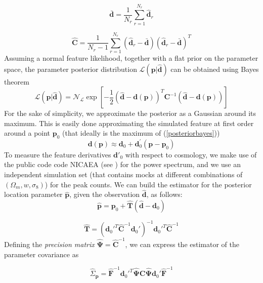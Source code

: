 \documentclass[reprint,aps,prd,superscriptaddress,showkeys,showpacs]{revtex4-1}
\newcommand{\bb}[1]{\mathbf{#1}}
\newcommand{\bbh}[1]{\mathbf{\hat{#1}}}
\newcommand{\h}[1]{\hat{#1}}
\begin{document}
\begin{equation}
\bb{\bar{d}} = \frac{1}{N_r}\sum_{r=1}^{N_r} \bbh{d}_r
\end{equation}

\begin{equation}
\label{covest}
\bbh{C} = \frac{1}{N_r-1}\sum_{r=1}^{N_r} (\bbh{d}_r - \bar{\bb{d}}) (\bbh{d}_r - \bar{\bb{d}})^T
\end{equation}
%
Assuming a normal feature likelihood, together with a flat prior on the parameter space, the parameter posterior distribution $\mathcal{L}(\bb{p}\vert\bbh{d})$ can be obtained using Bayes theorem
\begin{equation}
\label{posteriorbayes}
\mathcal{L}(\bb{p}\vert\bbh{d}) = \mathcal{N}_\mathcal{L}\exp{\left[-\frac{1}{2}(\bbh{d}-\bb{d}(\bb{p}))^T\bb{C}^{-1}(\bbh{d}-\bb{d}(\bb{p}))\right]}
\end{equation}
%
For the sake of simplicity, we approximate the posterior as a Gaussian around its maximum. This is easily done approximating the simulated feature at first order around a point $\bb{p}_0$ (that ideally is the maximum of (\ref{posteriorbayes}))
\begin{equation}
\bb{d}(\bb{p}) \approx \bb{d}_0 + \bb{d}_0^\prime(\bb{p}-\bb{p}_0) 
\end{equation}
%
To measure the feature derivatives $\bb{d}'_0$ with respect to cosmology, we make use of the public code code NICAEA (see \citep{Nicaea}) for the power spectrum, and we use an independent simulation set (that contains mocks at different combinations of $(\Omega_m,w,\sigma_8)$) for the peak counts.
We can build the estimator for the posterior location parameter $\bbh{p}$, given the observation $\bbh{d}$, as follows:
%
\begin{equation}
\label{estimatormean}
\bbh{p} = \bb{p}_0 + \bbh{T}(\bbh{d}-\bb{d}_0)
\end{equation}

\begin{equation}
\bbh{T} = (\bb{d}_0'^T\bbh{C}^{-1}\bb{d}_0')^{-1}\bb{d}_0'^T\bbh{C}^{-1}
\end{equation}
%
Defining the \textit{precision matrix} $\bbh{\Psi}=\bbh{C}^{-1}$, we can express the estimator of the parameter covariance as 

\begin{equation}
\label{estimatorcovariance}
\h{\Sigma}_\bb{p} = \bbh{F}^{-1}\bb{d}_0'^T\bbh{\Psi}\bb{C}\bbh{\Psi}\bb{d}_0'\bbh{F}^{-1}
\end{equation}
\end{document}
